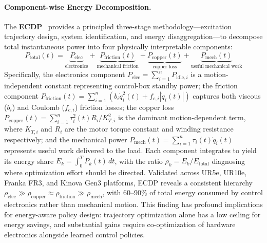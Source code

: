 \documentclass[acmsmall,screen,review,anonymous]{acmart}
\begin{document}
\paragraph{Component-wise Energy Decomposition.}
The \textbf{ECDP}~\cite{heredia2023ecdp} provides a principled three-stage methodology---excitation trajectory design, system identification, and energy disaggregation---to decompose total instantaneous power into four physically interpretable components:
\begin{equation}
  P_{\text{total}}(t) = \underbrace{P_{\text{elec}}}_{\text{electronics}} + \underbrace{P_{\text{friction}}(t)}_{\text{mechanical friction}} + \underbrace{P_{\text{copper}}(t)}_{\text{copper loss}} + \underbrace{P_{\text{mech}}(t)}_{\text{useful mechanical work}}
\end{equation}
Specifically, the electronics component $P_{\text{elec}} = \sum_{i=1}^{n} P_{\text{idle},i}$ is a motion-independent constant representing control-box standby power; the friction component $P_{\text{friction}}(t) = \sum_{i=1}^{n} (b_i \dot{q}_i^2(t) + f_{c,i} |\dot{q}_i(t)|)$ captures both viscous ($b_i$) and Coulomb ($f_{c,i}$) friction losses; the copper loss $P_{\text{copper}}(t) = \sum_{i=1}^{n} \tau_i^2(t) R_i / K_{T,i}^2$ is the dominant motion-dependent term, where $K_{T,i}$ and $R_i$ are the motor torque constant and winding resistance respectively; and the mechanical power $P_{\text{mech}}(t) = \sum_{i=1}^{n} \tau_i(t)\dot{q}_i(t)$ represents useful work delivered to the load. Each component integrates to yield its energy share $E_k = \int_0^T P_k(t)\,dt$, with the ratio $\rho_k = E_k / E_{\text{total}}$ diagnosing where optimization effort should be directed. Validated across UR5e, UR10e, Franka FR3, and Kinova Gen3 platforms, ECDP reveals a consistent hierarchy $\rho_{\text{elec}} \gg \rho_{\text{copper}} \approx \rho_{\text{friction}} \gg \rho_{\text{mech}}$, with 60--90\% of total energy consumed by control electronics rather than mechanical motion. This finding has profound implications for energy-aware policy design: trajectory optimization alone has a low ceiling for energy savings, and substantial gains require co-optimization of hardware electronics alongside learned control policies.
\end{document}
